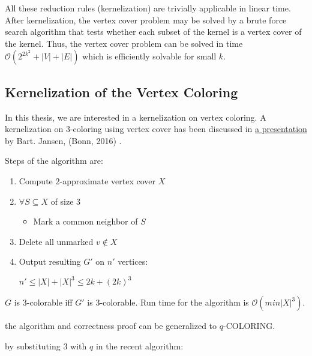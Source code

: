 \documentclass{beamer}
\begin{document}
{\begin{defi}
\begin{exam}
\begin{itemize}
  
\end{itemize}



All these reduction rules (kernelization) are trivially applicable in linear time. After kernelization, the vertex cover problem may be solved by a brute force search algorithm that tests whether each subset of the kernel is a vertex cover of the kernel. Thus, the vertex cover problem can be solved in time $\mathcal{O}(2^{2k^2} + |V| + |E|)$ which is efficiently solvable for small $k$.
\end{exam}

\newpage
\subsection{Kernelization of the Vertex Coloring}

In this thesis, we are interested in a kernelization on vertex coloring. 
A kernelization on $3$-coloring using vertex cover has been discussed in \href{https://onedrive.live.com/view.aspx?resid=D39E73028C0B20E6!2586&ithint=file%2cpptx&app=PowerPoint&authkey=!AFs8zyWC8bfQ0PA}{a presentation} by Bart. Jansen, (Bonn, 2016) \cite{bart}.

Steps of the algorithm are:

\begin{enumerate}
\item Compute $2$-approximate vertex cover $X$

\item $\forall S\subseteq X$ of size $3$
\begin{itemize}
\item Mark a common neighbor of $S$
\end{itemize}
\item Delete all unmarked $v \not\in X$

\item Output resulting $G'$ on $n'$ vertices:

\begin{center}
$n' \leq |X| + |X|^3 \leq 2k + (2k)^3$
\end{center}
\end{enumerate}

$G$ is $3$-colorable iff $G'$ is $3$-colorable. Run time for the algorithm is $\mathcal{O}(min|X|^3)$.

the algorithm and correctness proof can be generalized to $q$-COLORING. \cite{kra}


by substituting $3$ with $q$ in the recent algorithm:


\end{defi}}
\end{document}
